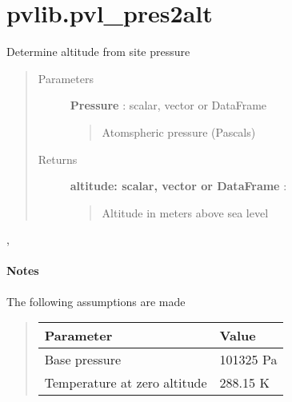 \documentclass[letterpaper,10pt,english]{sphinxmanual}
\begin{document}
\section{pvlib.pvl\_pres2alt}
\label{stubs/pvlib.pvl_pres2alt:pvlib-pvl-pres2alt}\label{stubs/pvlib.pvl_pres2alt::doc}

\begin{fulllineitems}
\label{stubs/pvlib.pvl_pres2alt:pvlib.pvl_pres2alt}
Determine altitude from site pressure
\begin{quote}\begin{description}
\item[{Parameters}] \leavevmode
\textbf{Pressure} : scalar, vector or DataFrame
\begin{quote}

Atomspheric pressure (Pascals)
\end{quote}

\item[{Returns}] \leavevmode
\textbf{altitude: scalar, vector or DataFrame} :
\begin{quote}

Altitude in meters above sea level
\end{quote}

\end{description}\end{quote}




{\hyperref[stubs/pvlib.pvl_alt2pres:pvlib.pvl_alt2pres]{}}, {\hyperref[stubs/pvlib.pvl_makelocationstruct:pvlib.pvl_makelocationstruct]{}}


\paragraph{Notes}

The following assumptions are made
\begin{quote}

\begin{tabulary}{\linewidth}{|L|L|}
\hline
\textsf{\relax 
Parameter
} & \textsf{\relax 
Value
}\\
\hline
Base pressure
 & 
101325 Pa
\\

Temperature at zero altitude
 & 
288.15 K
\\


\end{tabulary}
\end{quote}
\end{fulllineitems}
\end{document}

